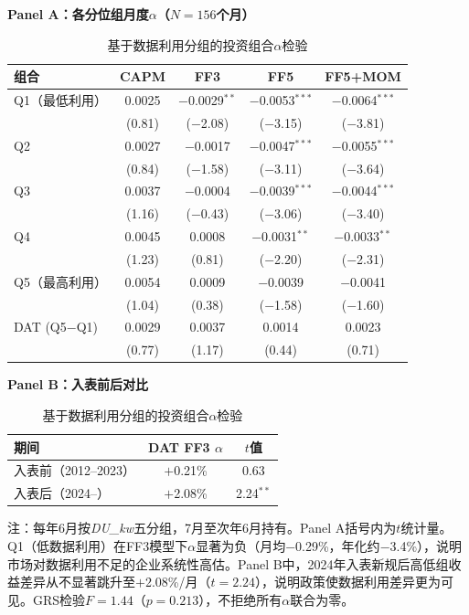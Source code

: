 \documentclass[11pt,a4paper]{article}
\newcommand{\hei}{\CJKfamily{hei}\bfseries}
\begin{document}
\begin{table}[htbp]
\centering
\caption{基于数据利用分组的投资组合$\alpha$检验}
\label{tab:portfolio}
\small

\vspace{4pt}
{\hei Panel A：各分位组月度$\alpha$（$N=156$个月）}
\vspace{4pt}

\begin{tabular}{lcccc}
\toprule
组合 & CAPM & FF3 & FF5 & FF5+MOM \\
\midrule
Q1（最低利用）
 & 0.0025 & $-$0.0029$^{**}$ & $-$0.0053$^{***}$ & $-$0.0064$^{***}$ \\
 & (0.81) & ($-$2.08) & ($-$3.15) & ($-$3.81) \\[3pt]
Q2
 & 0.0027 & $-$0.0017 & $-$0.0047$^{***}$ & $-$0.0055$^{***}$ \\
 & (0.84) & ($-$1.58) & ($-$3.11) & ($-$3.64) \\[3pt]
Q3
 & 0.0037 & $-$0.0004 & $-$0.0039$^{***}$ & $-$0.0044$^{***}$ \\
 & (1.16) & ($-$0.43) & ($-$3.06) & ($-$3.40) \\[3pt]
Q4
 & 0.0045 & 0.0008 & $-$0.0031$^{**}$ & $-$0.0033$^{**}$ \\
 & (1.23) & (0.81) & ($-$2.20) & ($-$2.31) \\[3pt]
Q5（最高利用）
 & 0.0054 & 0.0009 & $-$0.0039 & $-$0.0041 \\
 & (1.04) & (0.38) & ($-$1.58) & ($-$1.60) \\[3pt]
\midrule
DAT (Q5$-$Q1)
 & 0.0029 & 0.0037 & 0.0014 & 0.0023 \\
 & (0.77) & (1.17) & (0.44) & (0.71) \\
\bottomrule
\end{tabular}

\vspace{14pt}
{\hei Panel B：入表前后对比}
\vspace{4pt}

\begin{tabular}{lcc}
\toprule
期间 & DAT FF3 $\alpha$ & $t$值 \\
\midrule
入表前（2012--2023） & $+$0.21\% & 0.63 \\
入表后（2024--） & $+$2.08\% & 2.24$^{**}$ \\
\bottomrule
\end{tabular}

\vspace{6pt}
{\footnotesize 注：每年6月按\textit{DU\_kw}五分组，7月至次年6月持有。Panel A括号内为$t$统计量。Q1（低数据利用）在FF3模型下$\alpha$显著为负（月均$-$0.29\%，年化约$-$3.4\%），说明市场对数据利用不足的企业系统性高估。Panel B中，2024年入表新规后高低组收益差异从不显著跳升至$+$2.08\%/月（$t=2.24$），说明政策使数据利用差异更为可见。GRS检验$F=1.44$（$p=0.213$），不拒绝所有$\alpha$联合为零。}
\end{table}
\end{document}
